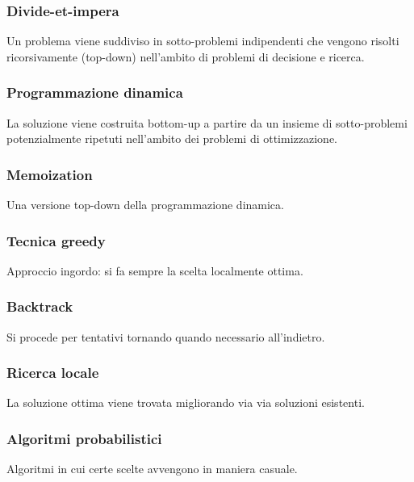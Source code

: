 \subsubsection{Divide-et-impera}
Un problema viene suddiviso in sotto-problemi indipendenti che vengono risolti ricorsivamente (top-down) nell'ambito di problemi di decisione e ricerca.
\subsubsection{Programmazione dinamica}
La soluzione viene costruita bottom-up a partire da un insieme di sotto-problemi potenzialmente ripetuti nell'ambito dei problemi di ottimizzazione.
\subsubsection{Memoization}
Una versione top-down della programmazione dinamica.
\subsubsection{Tecnica greedy}
Approccio ingordo: si fa sempre la scelta localmente ottima.
\subsubsection{Backtrack}
Si procede per tentativi tornando quando necessario all'indietro.
\subsubsection{Ricerca locale}
La soluzione ottima viene trovata migliorando via via soluzioni esistenti.
\subsubsection{Algoritmi probabilistici}
Algoritmi in cui certe scelte avvengono in maniera casuale. 